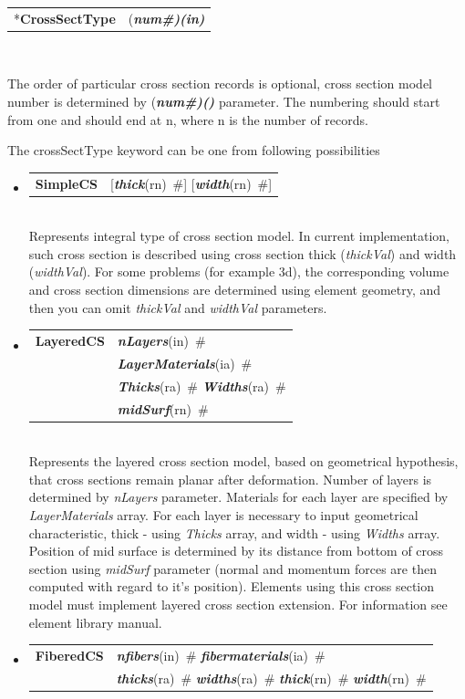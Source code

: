 \documentclass[a4paper]{article}
\makeatletter
\newcommand{\param}[1]{{\em #1}}
\newcommand{\fieldVal}[2]{\mbox{({\it\bf{#1}\#)\tiny (#2)}}}
\newcommand{\keywordnotype}[1]{\mbox{{\it{\bf{#1}}}}}
\newcommand{\keyword}[2]{\mbox{{\keywordnotype{#1}\tiny (#2)}}}
\newcommand{\entKeyword}[1]{\mbox{{*{\bf{#1}}}}}
\newcommand{\entKeywordInst}[1]{\mbox{{\bf{{#1}}}}}
\newcommand{\field}[2]{\mbox{\keyword{#1}{#2}~\#}}
\newcommand{\optField}[2]{\mbox{[\field{#1}{#2}]}}
\newenvironment{record}[1][]{\begin{tabular}{|ll}}{\end{tabular}\\}
\newcommand{\recentry}[2]{{#1}&{#2}\\}
\newcounter{rcc}
\newenvironment{record}[1][\textwidth]{\setcounter{rcc}{0}\begin{tabular*}{#1}{|ll@{\extracolsep{\fill}}r}}{\end{tabular*}\\}
\newcommand{\recentry}[2]{\ifthenelse{\value{rcc}>0}{&$\backslash$ \\}{\setcounter{rcc}{1}}{#1}&{#2}}
\makeatother
\begin{document}
\begin{record}[0.9\textwidth]
  \recentry{\entKeyword{CrossSectType}}{\fieldVal{num}{in}}
\end{record}

The order of particular cross section records is optional, cross section
model number is determined by \fieldVal{num}{} parameter.
The numbering should start from one and should end at n, where n is the number of records.

The crossSectType keyword can be one from following possibilities
\begin{itemize}
\item
  \begin{record}[0.9\textwidth]
  \recentry{\entKeywordInst{SimpleCS}}{\optField{thick}{rn} \optField{width}{rn}}
  \end{record}
Represents integral type of cross section model. In current
implementation, such cross section is described using cross section
thick (\param{thickVal}) and width (\param{widthVal}). For some
problems (for example
3d), the corresponding volume and cross section dimensions are
determined using element geometry, and then you can omit \param{thickVal} and \param{widthVal}
parameters.
\item
  \begin{record}[0.9\textwidth]
    \recentry{\entKeywordInst{LayeredCS}}{\field{nLayers}{in}}
    \recentry{}{\field{LayerMaterials}{ia}}
    \recentry{}{\field{Thicks}{ra} \field{Widths}{ra}}
    \recentry{}{\field{mid\-Surf}{rn}}
  \end{record}
Represents the layered cross section model, based on
geometrical hypothesis, that cross sections remain planar after
deformation. Number of layers is
determined by \param{nLayers} parameter. Materials for each
layer are specified by \param{LayerMaterials} array. For each layer is
necessary to input
geometrical characteristic, thick - using \param{Thicks} array, and
width - using
\param{Widths} array. Position of mid surface is determined by its
distance from
bottom of cross section using \param{mid\-Surf} parameter (normal and
momentum forces are then computed with regard to it's position).
Elements using this cross section model must implement layered cross
section extension. For information see element library manual.
\item
  \begin{record}[0.9\textwidth]
    \recentry{\entKeywordInst{FiberedCS}}{\field{nfibers}{in} \field{fibermaterials}{ia}}
    \recentry{}{\field{thicks}{ra} \field{widths}{ra} \field{thick}{rn} \field{width}{rn}}

\end{record}
\end{itemize}
\end{document}
